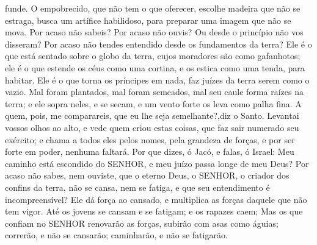 {{} funde.
O empobrecido, que não tem o que oferecer, escolhe madeira que não se estraga,
{} busca um artífice habilidoso, para preparar uma imagem que não se mova.
Por acaso não sabeis? Por acaso não ouvis? Ou desde o princípio não vos disseram? Por acaso não tendes entendido desde os fundamentos da terra?
Ele é o que está sentado sobre o globo da terra, cujos moradores são
{} como gafanhotos; ele é o que estende os céus como uma cortina, e os estica como uma tenda, para
{} habitar.
Ele é o que torna os príncipes em nada,
{} faz juízes da terra serem como o vazio.
Mal foram plantados, mal foram semeados, mal seu caule forma raízes na terra; e
{} ele sopra neles, e se secam, e um vento forte os leva como palha fina.
A quem, pois, me comparareis, que eu lhe seja semelhante?,diz o Santo.
Levantai vossos olhos ao alto, e vede quem criou estas coisas, que faz sair numerado seu exército; e chama a todos eles pelos nomes, pela grandeza de
{} forças, e por ser forte em poder, nenhuma
{} faltará.
Por que dizes, ó Jacó, e falas, ó Israel: Meu caminho está escondido do SENHOR, e meu juízo passa longe de meu Deus?
Por acaso não sabes, nem ouviste, que o eterno Deus, o SENHOR, o criador dos confins da terra, não se cansa, nem se fatiga, e que seu entendimento é incompreensível?
Ele dá força ao cansado, e multiplica as forças daquele que não tem vigor.
Até os jovens se cansam e se fatigam; e os rapazes caem;
Mas os que confiam no SENHOR renovarão as forças, subirão com asas como águias; correrão, e não se cansarão; caminharão, e não se fatigarão.

}
